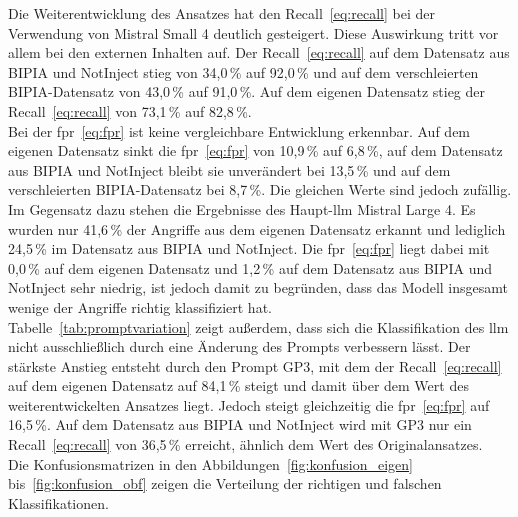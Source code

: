 \begin{table}[htbp]
\centering
\caption{Ergebnisse der acht Durchläufe}

\label{tab:ergebnisse}
\end{table}

\begin{table}[htbp]
\centering
\caption{Recall und FPR der Promptvariation}
\label{tab:promptvariation}

\end{table}

Die Weiterentwicklung des Ansatzes hat den Recall~\eqref{eq:recall} bei der Verwendung von Mistral Small 4 deutlich gesteigert. 
Diese Auswirkung tritt vor allem bei den externen Inhalten auf. Der Recall~\eqref{eq:recall} auf dem Datensatz aus BIPIA und NotInject stieg von 34,0\,\% auf 92,0\,\% und auf 
dem verschleierten BIPIA-Datensatz von 43,0\,\% auf 91,0\,\%. Auf dem eigenen Datensatz stieg der Recall~\eqref{eq:recall} von 73,1\,\% auf 82,8\,\%. \\
Bei der \ac{fpr}~\eqref{eq:fpr} ist keine vergleichbare Entwicklung erkennbar.
Auf dem eigenen Datensatz sinkt die \ac{fpr}~\eqref{eq:fpr} von 10,9\,\% auf 6,8\,\%, auf dem Datensatz aus BIPIA und NotInject bleibt sie unverändert bei 13,5\,\% und auf
dem verschleierten BIPIA-Datensatz bei 8,7\,\%. Die gleichen Werte sind jedoch zufällig. \\
Im Gegensatz dazu stehen die Ergebnisse des Haupt-\ac{llm} Mistral Large 4. Es wurden nur 41,6\,\% der Angriffe aus dem eigenen Datensatz erkannt und lediglich
24,5\,\% im Datensatz aus BIPIA und NotInject. Die \ac{fpr}~\eqref{eq:fpr} liegt dabei mit 0,0\,\% auf dem eigenen Datensatz und 1,2\,\% auf dem Datensatz
aus BIPIA und NotInject sehr niedrig, ist jedoch damit zu begründen, dass das Modell insgesamt wenige
der Angriffe richtig klassifiziert hat. \\
Tabelle~\ref{tab:promptvariation} zeigt außerdem, dass sich die Klassifikation des \ac{llm} nicht ausschließlich durch eine Änderung des Prompts verbessern lässt.
Der stärkste Anstieg entsteht durch den Prompt GP3, mit dem der Recall~\eqref{eq:recall} auf dem eigenen Datensatz auf 84,1\,\% steigt und damit über dem Wert des 
weiterentwickelten Ansatzes liegt. Jedoch steigt gleichzeitig die \ac{fpr}~\eqref{eq:fpr} auf 16,5\,\%. Auf dem Datensatz aus BIPIA und NotInject wird mit GP3 nur ein Recall~\eqref{eq:recall} von
36,5\,\% erreicht, ähnlich dem Wert des Originalansatzes. \\
Die Konfusionsmatrizen in den Abbildungen~\ref{fig:konfusion_eigen} bis~\ref{fig:konfusion_obf} zeigen die Verteilung der richtigen und falschen Klassifikationen.


